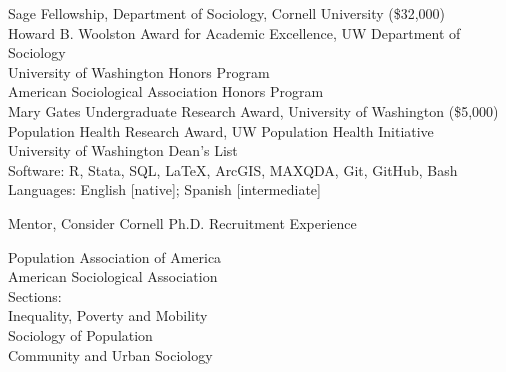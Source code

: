 \documentclass[11pt]{article} %
\begin{document}
 Sage Fellowship, Department of Sociology, Cornell University (\$32,000) \\
 Howard B. Woolston Award for Academic Excellence, UW Department of Sociology \\
 University of Washington Honors Program \\
 American Sociological Association Honors Program \\
 Mary Gates Undergraduate Research Award, University of Washington (\$5,000)	\\	
 Population Health Research Award, UW Population Health Initiative 	\\
 University of Washington Dean’s List \\					     

Software: R, Stata, SQL, \LaTeX, ArcGIS, MAXQDA, Git, GitHub, Bash \\
Languages: English [native]; Spanish [intermediate] \\


\hspace*{10mm} Mentor, Consider Cornell Ph.D. Recruitment Experience \\
\smallskip 

Population Association of America \\
American Sociological Association \\
Sections: \\
\hspace*{10mm} Inequality, Poverty and Mobility \\
\hspace*{10mm} Sociology of Population \\
\hspace*{10mm} Community and Urban Sociology \\
\end{document}
